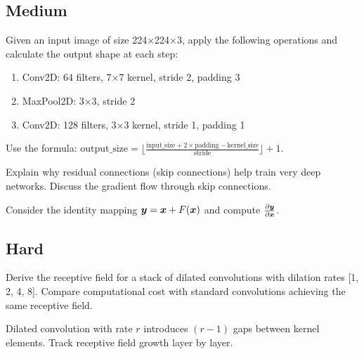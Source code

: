 \subsection*{Medium}

\begin{exercisebox}[medium]
\begin{problem}
Given an input image of size 224×224×3, apply the following operations and calculate the output shape at each step:
\begin{enumerate}
    \item Conv2D: 64 filters, 7×7 kernel, stride 2, padding 3
    \item MaxPool2D: 3×3, stride 2
    \item Conv2D: 128 filters, 3×3 kernel, stride 1, padding 1
\end{enumerate}
\end{problem}
\begin{hintbox}
Use the formula: $\text{output\_size} = \lfloor \frac{\text{input\_size} + 2 \times \text{padding} - \text{kernel\_size}}{\text{stride}} \rfloor + 1$.
\end{hintbox}
\end{exercisebox}


\begin{exercisebox}[medium]
\begin{problem}
Explain why residual connections (skip connections) help train very deep networks. Discuss the gradient flow through skip connections.
\end{problem}
\begin{hintbox}
Consider the identity mapping $\boldsymbol{y} = \boldsymbol{x} + F(\boldsymbol{x})$ and compute $\frac{\partial \boldsymbol{y}}{\partial \boldsymbol{x}}$.
\end{hintbox}
\end{exercisebox}


\subsection*{Hard}

\begin{exercisebox}[hard]
\begin{problem}
Derive the receptive field for a stack of dilated convolutions with dilation rates [1, 2, 4, 8]. Compare computational cost with standard convolutions achieving the same receptive field.
\end{problem}
\begin{hintbox}
Dilated convolution with rate $r$ introduces $(r-1)$ gaps between kernel elements. Track receptive field growth layer by layer.
\end{hintbox}
\end{exercisebox}


